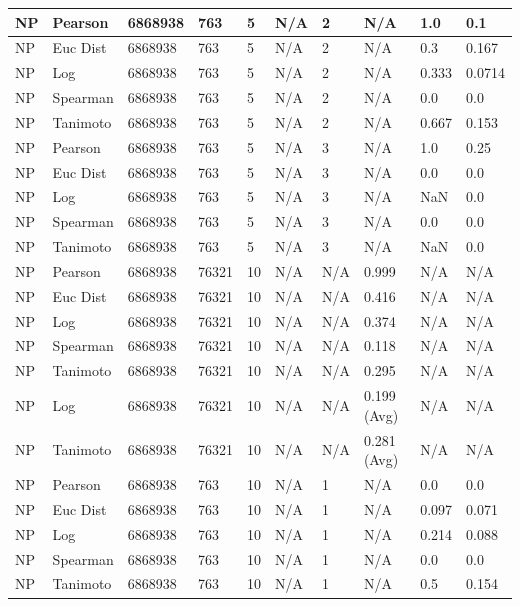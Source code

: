\documentclass{article}
\begin{document}
\begin{longtable}{ |p{1.7cm}|p{1.9cm}|p{1.5cm}|p{1.5cm}|p{0.75cm}|p{0.75cm}|p{0.75cm}|p{0.75cm}|p{1.5cm}|p{1.5cm}|}
    NP & Pearson & 6868938 & 763 & 5 &  N/A & 2 & N/A & 1.0 & 0.1  \\ \hline
    NP & Euc Dist & 6868938 & 763 & 5 & N/A & 2  & N/A &0.3 & 0.167   \\ \hline
    NP & Log & 6868938 & 763 & 5 &  N/A & 2  & N/A & 0.333 & 0.0714  \\ \hline
    NP & Spearman & 6868938 & 763 & 5 & N/A & 2  & N/A &0.0 & 0.0 \\ \hline
    NP & Tanimoto & 6868938 & 763 & 5 & N/A & 2  & N/A & 0.667 & 0.153 \\ \hline
    
    NP & Pearson & 6868938 & 763 & 5 &  N/A & 3 & N/A & 1.0 & 0.25  \\ \hline
    NP & Euc Dist & 6868938 & 763 & 5 & N/A &  3 & N/A &0.0 & 0.0   \\ \hline
    NP & Log & 6868938 & 763 & 5 &  N/A &  3 & N/A & NaN & 0.0  \\ \hline
    NP & Spearman & 6868938 & 763 & 5 & N/A &  3 & N/A &0.0 & 0.0 \\ \hline
    NP & Tanimoto & 6868938 & 763 & 5 & N/A &  3 & N/A & NaN & 0.0 \\ \hline
    
    NP & Pearson & 6868938 & 76321 & 10 &  N/A & N/A & 0.999 & N/A & N/A  \\ \hline
    NP & Euc Dist & 6868938 & 76321 & 10 & N/A & N/A & 0.416 & N/A & N/A   \\ \hline
    NP & Log & 6868938 & 76321 & 10 &  N/A & N/A & 0.374 & N/A & N/A  \\ \hline
    NP & Spearman & 6868938 & 76321 & 10 & N/A & N/A & 0.118 & N/A & N/A \\ \hline
    NP & Tanimoto & 6868938 & 76321 & 10 & N/A & N/A & 0.295 & N/A & N/A \\ \hline
    NP & Log & 6868938 & 76321 & 10 & N/A & N/A & 0.199 (Avg) & N/A & N/A \\ \hline
    NP & Tanimoto & 6868938 & 76321 & 10 & N/A & N/A & 0.281 (Avg) & N/A & N/A \\ \hline
    
    NP & Pearson & 6868938 & 763 & 10 &  N/A & 1 & N/A & 0.0 & 0.0  \\ \hline
    NP & Euc Dist & 6868938 & 763 & 10 & N/A & 1 & N/A &0.097 & 0.071   \\ \hline
    NP & Log & 6868938 & 763 & 10 &  N/A & 1 & N/A & 0.214 & 0.088  \\ \hline
    NP & Spearman & 6868938 & 763 & 10 & N/A & 1 & N/A &0.0 & 0.0 \\ \hline
    NP & Tanimoto & 6868938 & 763 & 10 & N/A & 1 & N/A & 0.5 & 0.154 \\ \hline
    

\end{longtable}
\end{document}

